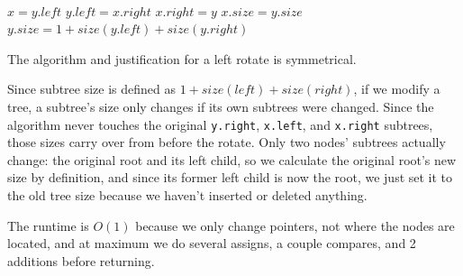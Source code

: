 \documentclass[11pt]{article}
\begin{document}
\begin{enumerate}
\begin{enumerate}
        \begin{mysolution}
        \begin{algorithm}[H]
        \nonl {}\\
        $x = y.\mathit{left}$\;
        $y.\mathit{left} = x.\mathit{right}$\;
        $x.\mathit{right} = y$\;
        $x.\mathit{size} = y.\mathit{size}$ 
        $y.\mathit{size} = 1 + \mathit{size}(y.\mathit{left}) + \mathit{size}(y.\mathit{right})$ 
        \caption{RotateRight}
        \end{algorithm}

        	The algorithm and justification for a left rotate is symmetrical.
        	
        	Since subtree size is defined as $1+size(left)+size(right)$, if we modify a tree, a subtree's size only changes if its own subtrees were changed. Since the algorithm never touches the original \texttt{y.right}, \texttt{x.left}, and \texttt{x.right} subtrees, those sizes carry over from before the rotate. Only two nodes' subtrees actually change: the original root and its left child, so we calculate the original root's new size by definition, and since its former left child is now the root, we just set it to the old tree size because we haven't inserted or deleted anything.
        	
        	The runtime is $O(1)$ because we only change pointers, not where the nodes are located, and at maximum we do several assigns, a couple compares, and 2 additions before returning.
        \end{mysolution}


        \newenvironment{tmpSol}{%
           \setlength{\parindent}{0pt}
           \color{blue}
        }{}

    \end{enumerate}
    

\end{enumerate}
\end{document}
